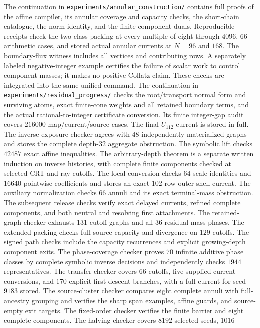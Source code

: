 \documentclass[11pt]{article}
\begin{document}
The continuation in \texttt{experiments/annular\_construction/} contains
full proofs of the affine compiler, its annular coverage and capacity
checks, the short-chain catalogue, the norm identity, and the finite
component duals. Reproducible receipts check the two-class packing at
every multiple of eight through $4096$, 66 arithmetic cases, and stored
actual annular currents at $N=96$ and $168$. The boundary-flux witness
includes all vertices and contributing rows. A separately labeled
negative-integer example certifies the failure of scalar work to
control component masses; it makes no positive Collatz claim.
These checks are integrated into the same unified command.
The continuation in \texttt{experiments/residual\_progress/} checks the
root/transport normal form and surviving atoms, exact finite-cone weights
and all retained boundary terms, and the actual rational-to-integer
certificate conversion. Its finite integer-gap audit covers $216000$
map/current/source cases. The final $U_{112}$ current is stored in full.
The inverse exposure checker agrees with $48$ independently materialized
graphs and stores the complete depth-$32$ aggregate obstruction.
The symbolic lift checks $42487$ exact affine inequalities. The
arbitrary-depth theorem is a separate written induction on inverse
histories, with complete finite components checked at selected CRT and
ray cutoffs. The local conversion checks $64$ scale identities and
$16640$ pointwise coefficients and stores an exact $102$-row outer-shell
current. The auxiliary normalization checks $66$ annuli and its exact
terminal-mass obstruction.
The subsequent release checks verify exact delayed currents, refined
complete components, and both neutral and resolving first attachments.
The retained-graph checker exhausts $131$ cutoff graphs and all $36$
residual mass phases. The extended packing checks full source capacity
and divergence on $129$ cutoffs. The signed path checks include the
capacity recurrences and explicit growing-depth component exits.
The phase-coverage checker proves $70$ infinite additive phase classes
by complete symbolic inverse decisions and independently checks $1944$
representatives. The transfer checker covers $66$ cutoffs, five supplied
current conversions, and $170$ explicit first-descent branches, with a
full current for seed $9183$ stored. The source-cluster checker compares
eight complete annuli with full-ancestry grouping and verifies the sharp
span examples, affine guards, and source-empty exit targets.
The fixed-order checker verifies the finite barrier and eight complete
components. The halving checker covers $8192$ selected seeds, $1016$
\end{document}
